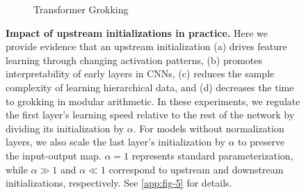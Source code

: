 \documentclass{article}
\theoremstyle{plain}
\theoremstyle{definition}
\theoremstyle{remark}
\begin{document}
\begin{figure}[t]
\begin{subfigure}{0.23\textwidth}
        \caption{Transformer Grokking}
    \end{subfigure}
    \caption{\textbf{Impact of upstream initializations in practice.}
    Here we provide evidence that an upstream initialization (a) drives feature learning through changing activation patterns, (b) promotes interpretability of early layers in CNNs, (c) reduces the sample complexity of learning hierarchical data, and (d) decreases the time to grokking in modular arithmetic.
    In these experiments, we regulate the first layer's learning speed relative to the rest of the network by dividing its initialization by \(\alpha\). For models without normalization layers, we also scale the last layer's initialization by \(\alpha\) to preserve the input-output map. \(\alpha = 1\) represents standard parameterization, while \(\alpha \gg 1\) and \(\alpha \ll 1\) correspond to upstream and downstream initializations, respectively.
    See \cref{app:fig-5} for details.}
    \label{fig:deep-network}
    \vspace{-18pt}
\end{figure}
\end{document}
